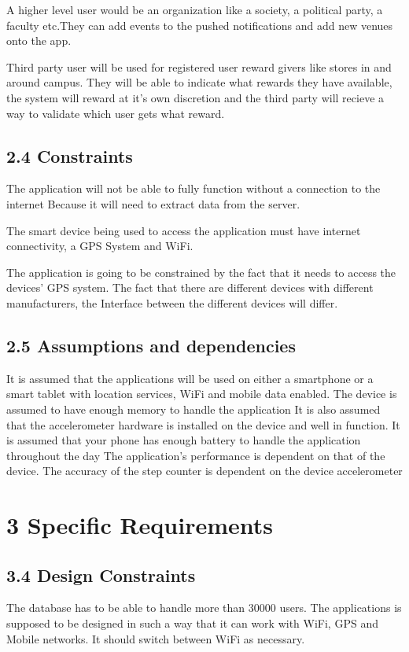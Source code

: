 \documentclass[11pt]{article}
\begin{document}
		A higher level user would be an organization like a society, a political party, a faculty etc.They can add events to the 		 pushed notifications and add new venues onto the app. 

		Third party user will be used for registered user reward givers like stores in and around campus. They will be able to 			indicate what rewards they have available, the system will reward at it’s own discretion and the third party will 			recieve a way to validate which user gets what reward.

		\subsection{2.4 Constraints}
		The application will not be able to fully function without a connection to the internet Because it will need to extract 		data from the server.

		The smart device being used to access the application must have internet connectivity, a GPS 
		System and WiFi.

		The application is going to be constrained by the fact that it needs to access the devices’ 
		GPS system. The fact that there are different devices with different manufacturers, the Interface between the different 		devices will differ.

		\subsection{2.5 Assumptions and dependencies}
		It is assumed that the applications will be used on either a smartphone or a smart tablet with location services, WiFi 			and mobile data enabled.
		The device is assumed to have enough memory to handle the application
		It is also assumed that the accelerometer hardware is installed on the device and well in function.
		It is assumed that your phone has enough battery to handle the application throughout the day
		The application’s performance is dependent on that of the device.
		The accuracy of the step counter is dependent on the device accelerometer
		
		\section{3 Specific Requirements}
		
		\subsection{3.4 Design Constraints}
		The database has to be able to handle more than 30000 users. The applications is supposed to be designed in such a way 			that it can work with WiFi, GPS and Mobile networks. It should switch between WiFi as necessary.
\end{document}
